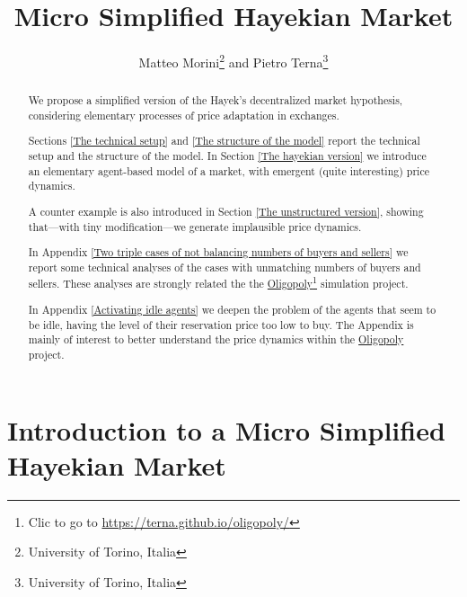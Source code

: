 \documentclass[10pt]{report}
\title{Micro Simplified Hayekian Market}
\author{Matteo Morini\footnote{University of Torino, Italia} and Pietro Terna\footnote{University of Torino, Italia}}
\begin{document}
\maketitle
\thispagestyle{fancy}



\begin{abstract}
\thispagestyle{fancy}

We propose a simplified version of the Hayek's decentralized market hypothesis, considering elementary processes of price adaptation in exchanges.

Sections \ref{The technical setup} and \ref{The structure of the model} report the technical setup and the structure of the model. In Section \ref{The hayekian version} we introduce an elementary agent-based model of a market, with emergent (quite interesting)  price dynamics.

A counter example is also introduced in Section \ref{The unstructured version}, showing that---with tiny modification---we generate implausible price dynamics.

In Appendix \ref{Two triple cases of not balancing numbers of buyers and sellers} we report some technical analyses of the cases with unmatching numbers of buyers and sellers. These analyses are strongly related the the \href{https://terna.github.io/oligopoly/}{Oligopoly}\footnote{Clic to go to \url{https://terna.github.io/oligopoly/}} simulation project.

In Appendix \ref{Activating idle agents} we deepen the problem of the agents that seem to be idle, having the level of their reservation price too low to buy. The Appendix is mainly of interest to  better understand the price dynamics within the \href{https://terna.github.io/oligopoly/}{Oligopoly} project.
\end{abstract}


\setcounter{page}{2}
\tableofcontents
\thispagestyle{fancy}


\listoffigures
\thispagestyle{fancy}
\setcounter{page}{2}




\chapter*{Introduction to a Micro Simplified Hayekian Market}
\label{micro Hayekian Market}
\thispagestyle{fancy}
%
\end{document}
